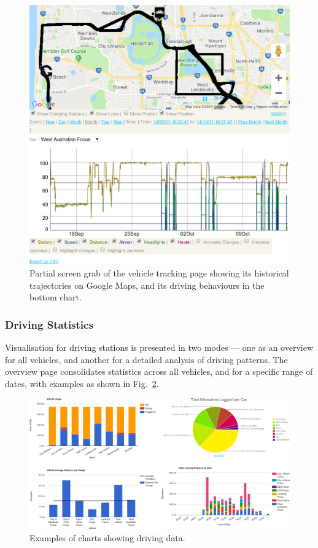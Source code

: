\begin{figure}[H]
	\centering
	\includegraphics[width=0.9\linewidth]{vt-t-vis-vt}
	\caption[Vehicle tracking page screen grab]{Partial screen grab of the vehicle tracking page showing its historical trajectories on Google Maps, and its driving behaviours in the bottom chart.}
	\label{fig:9:vt:vis:vt}
\end{figure}

\subsubsection{Driving Statistics}
Visualisation for driving stations is presented in two modes --- one as an overview for all vehicles, and another for a detailed analysis of driving patterns. The overview page consolidates statistics across all vehicles, and for a specific range of dates, with examples as shown in Fig.~\ref{fig:9:vt-t-vis-ds1}.

\begin{figure}[H]
	\centering
	\includegraphics[width=\linewidth]{vt-t-vis-ds1-crop}
	\caption{Examples of charts showing driving data.}
	\label{fig:9:vt-t-vis-ds1}
\end{figure}

